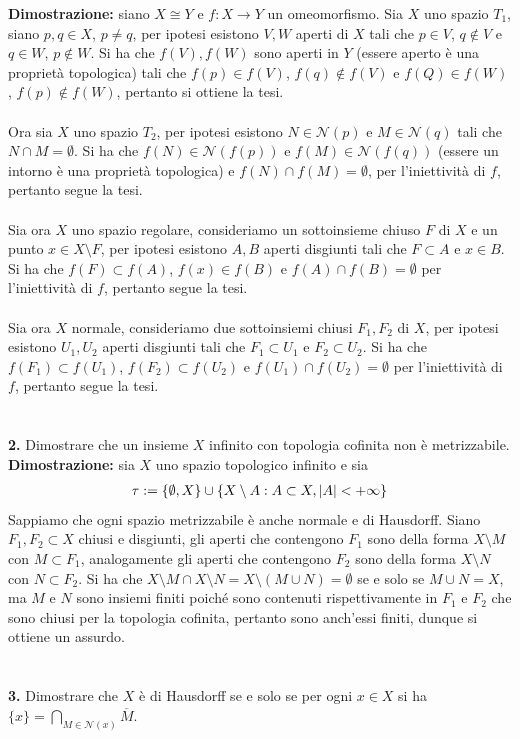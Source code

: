 \documentclass{article}
\begin{document}
\textbf{Dimostrazione:} siano $X \cong Y$ e $f : X \longrightarrow Y$ un omeomorfismo. Sia $X$ uno spazio $T_1$, siano $p, q \in X$, $p \neq q$, per ipotesi esistono $V, W$ aperti di $X$ tali che $p \in V$, $q \not\in V$ e $q \in W$, $p \not\in W$. Si ha che $f(V), f(W)$ sono aperti in $Y$ (essere aperto è una proprietà topologica) tali che $f(p) \in f(V)$, $f(q) \not\in f(V)$ e $f(Q) \in f(W)$, $f(p) \not\in f(W)$, pertanto si ottiene la tesi. \\ \\
Ora sia $X$ uno spazio $T_2$, per ipotesi esistono $N \in \mathcal{N}(p)$ e $M \in \mathcal{N}(q)$ tali che $N \cap M = \emptyset$. Si ha che $f(N) \in \mathcal{N}(f(p))$ e $f(M) \in \mathcal{N}(f(q))$ (essere un intorno è una proprietà topologica) e $f(N) \cap f(M) = \emptyset$, per l'iniettività di $f$, pertanto segue la tesi. \\ \\
Sia ora $X$ uno spazio regolare, consideriamo un sottoinsieme chiuso $F$ di $X$ e un punto $x \in X \setminus F$, per ipotesi esistono $A, B$ aperti disgiunti tali che $F \subset A$ e $x \in B$. Si ha che $f(F) \subset f(A)$, $f(x) \in f(B)$ e $f(A) \cap f(B) = \emptyset$ per l'iniettività di $f$, pertanto segue la tesi. \\ \\
Sia ora $X$ normale, consideriamo due sottoinsiemi chiusi $F_1, F_2$ di $X$, per ipotesi esistono $U_1, U_2$ aperti disgiunti tali che $F_1 \subset U_1$ e $F_2 \subset U_2$. Si ha che $f(F_1) \subset f(U_1)$, $f(F_2) \subset f(U_2)$ e $f(U_1) \cap f(U_2) = \emptyset$ per l'iniettività di $f$, pertanto segue la tesi. \\ \\ \\
\textbf{2.} Dimostrare che un insieme $X$ infinito con topologia cofinita non è metrizzabile. \\

\textbf{Dimostrazione:} sia $X$ uno spazio topologico infinito e sia 
\begin{gather}
    \tau := \{ \emptyset, X \} \cup \{ X \setminus A : A \subset X, |A| < +\infty \} \notag
\end{gather}
Sappiamo che ogni spazio metrizzabile è anche normale e di Hausdorff. Siano $F_1, F_2 \subset X$ chiusi e disgiunti, gli aperti che contengono $F_1$ sono della forma $X \setminus M$ con $M \subset F_1$, analogamente gli aperti che contengono $F_2$ sono della forma $X \setminus N$ con $N \subset F_2$. Si ha che $X \setminus M \cap X \setminus N = X \setminus (M \cup N) = \emptyset$ se e solo se $M \cup N = X$, ma $M$ e $N$ sono insiemi finiti poiché sono contenuti rispettivamente in $F_1$ e $F_2$ che sono chiusi per la topologia cofinita, pertanto sono anch'essi finiti, dunque si ottiene un assurdo. \\ \\ \\
\textbf{3.} Dimostrare che $X$ è di Hausdorff se e solo se per ogni $x \in X$ si ha $\{ x \} = \bigcap_{M \in \mathcal{N}(x)} \overline{M}$. \\
\end{document}
